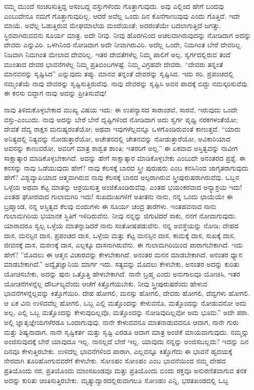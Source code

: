 ನಮ್ಮ ಮುಂದೆ ಸಂಚರಿಸುತ್ತಿದ್ದ ಅಸಂಬದ್ದ ವಸ್ತುಗಳೆಂದು ಗೊತ್ತಾಗುವುದು. ಅವು ಎಲ್ಲಿಂದ ಹೇಗೆ ಬಂದವು ಎಂಬುದೇನೂ ನಮಗೆ ಗೊತ್ತಾಗುವುದಿಲ್ಲ. ಆದರೆ ಅವೆಲ್ಲ ಒಂದು ದಿನ ಕೊನೆಗಾಣುವುವು ಎಂದು ಗೊತ್ತಿದೆ. ಇದೇ ಮಾಯೆ. ಅವೆಲ್ಲ ಓಡುತ್ತಿರುವ ಮೇಘಮಾಲೆಯ ಮಂದೆಯಂತೆ; ಅದರಂತೆಯೇ ಬದಲಾಗುತ್ತಿದೆ ಜಗತ್ತು. ಸ್ಥಿರವಾಗಿರುವವನು ಸೂರ್ಯ ಮಾತ್ರ. ಅದೇ ನೀವು. ನೀವು ಹೊರಗಿನಿಂದ ಅಚಲವಾಗಿರುವುದನ್ನು ನೋಡಿದಾಗ ಅದನ್ನು ದೇವರು ಎನ್ನುವಿರಿ. ಒಳಗಿನಿಂದ ನೋಡಿದಾಗ ಅದೇ ನೀವಾಗಿರುವಿರಿ. ಅದೆಲ್ಲ ಒಂದೇ, ನಿಮಗಿಂತ ಬೇರೆ ದೇವರಿಲ್ಲ. ನಿಜವಾಗಿ ನಿಮಗಿಂತ ಮೇಲಾದ ದೇವರಿಲ್ಲ. ಇತರ ದೇವತೆಗಳೆಲ್ಲ ನಿಮ್ಮ ಪಾಲಿಗೆ ಅಲ್ಪ. ಸ್ವರ್ಗದಲ್ಲಿರುವ ತಂದೆ ಮುಂತಾದ ದೇವರ ಭಾವನೆಗಳೆಲ್ಲ ನಿಮ್ಮ ಪ್ರತಿಬಿಂಬಗಳಷ್ಟೆ. ನಿಮ್ಮ ವಿಗ್ರಹವೇ ದೇವರು. “ದೇವರು ತನ್ನಂತೆ ಮಾನವನನ್ನು ಸೃಷ್ಟಿಸಿದ'' ಎನ್ನುವುದು ತಪ್ಪು. ಮಾನವ ತನ್ನಂತೆ ದೇವರನ್ನು ಸೃಷ್ಟಿಸಿದ. ಇದು ಸರಿ. ಪ್ರಪಂಚದಲ್ಲಿ ನಮ್ಮಂತೆಯೆ ನಾವು ದೇವರನ್ನು ಸೃಷ್ಟಿಸುತ್ತಿರುವೆವು. ನಾವು ದೇವರನ್ನು ಸೃಷ್ಟಿಸಿ ಅವನ ಪಾದಕ್ಕೆ ಬಿದ್ದು ನಮಸ್ಕರಿಸುವೆವು. ಈ ಕನಸು ಬಿದ್ದಾಗ ನಾವು ಅದನ್ನು ಪ್ರೀತಿಸುವೆವು!

ನಾವು ತಿಳಿದುಕೊಳ್ಳಬೇಕಾದ ಮುಖ್ಯ ವಿಷಯ ಇದು: ಈ ಉಪನ್ಯಾಸದ ಸಾರಾಂಶವೆ, ಸಾರವೆ, ಇರುವುದು ಒಂದೇ ವಸ್ತು-ಎಂಬುದು. ನಾವು ಅದನ್ನು ಬೇರೆ ಬೇರೆ ದೃಷ್ಟಿಗಳಿಂದ ನೋಡಿದಾಗ ಅದು ಸ್ವರ್ಗ ಪೃಥ್ವಿ ನರಕಗಳಂತೆಯೋ; ದೇವತೆ ದೆವ್ವ ರಾಕ್ಷಸ ಮನುಷ್ಯರಂತೆಯೋ; ಅಥವಾ ಇವುಗಳೆಲ್ಲವನ್ನೂ ಒಳಗೊಂಡಿರುವಂತೆ ಕಾಣುತ್ತದೆ. “ಯಾರು ಅನಿತ್ಯದಲ್ಲಿ ನಿತ್ಯವನ್ನು ನೋಡುತ್ತಾರೆಯೋ, ಅಚೇತನದಲ್ಲಿ ಚೇತನವನ್ನು ನೋಡುತ್ತಾರೆಯೋ, ಅವಿಕಾರಿಯಾದ ಅವನನ್ನು ಕಾಣುವರೋ, ಅವರಿಗೆ ಮಾತ್ರ ಶಾಶ್ವತ ಶಾಂತಿ; ಇತರರಿಗೆ ಅಲ್ಲ.” ಈ ಏಕವಾದ ಅಸ್ತಿತ್ವವನ್ನು ನಾವೀಗ ಸಾಕ್ಷಾತ್ಕಾರ ಮಾಡಿಕೊಳ್ಳಬೇಕಾಗಿದೆ. ಅದನ್ನು ಹೇಗೆ ಸಾಕ್ಷಾತ್ಕಾರ ಮಾಡಿಕೊಳ್ಳಬೇಕು ಎಂಬುದೇ ಅನಂತರದ ಪ್ರಶ್ನೆ. ಈ ಕನಸನ್ನು ನಾವು ಒಡೆಯುವುದು ಹೇಗೆ? ನಾವು ಕೆಲಸಕ್ಕೆ ಬಾರದ ಸ್ತ್ರೀ ಪುರುಷರು ಎಂಬ ಕನಸಿನಿಂದ ಜಾಗೃತರಾಗುವುದು ಹೇಗೆ? ವಿಶ್ವವ್ಯಾಪಿಯಾದ ಆತ್ಮವಾಗಿರುವ ನಾವು ಕೆಲಸಕ್ಕೆ ಬಾರದ ಅಲ್ಪರಾಗಿರುವ ಸ್ತ್ರೀಪುರುಷರಾಗಿರುವೆವು. ಒಬ್ಬನ ಒಳ್ಳೆಯ ಅಥವಾ ಕೆಟ್ಟ ಮಾತನ್ನು ಆಶ್ರಯಿಸುತ್ತ ಅಂಜಿಕೊಂಡಿರುವೆವು. ಎಂತಹ ಭಯಂಕರವಾದ ಅನ್ಯಾಶ್ರಯ ಇದು! ಎಂತಹ ಘೋರವಾದ ಗುಲಾಮಗಿರಿ ಇದು! ಸುಖದುಃಖಗಳಿಗೆ ಅತೀತನು ನಾನು, ನನ್ನ ಒಂದು ಛಾಯೆಯೇ ಈ ಬ್ರಹ್ಮಾಂಡ, ನನ್ನ ಅಸ್ತಿತ್ವದ ಕೆಲವು ಬಿಂದುಗಳು ಈ ಸೂರ್ಯ ಚಂದ್ರ ತಾರೆಗಳು. ಇಂತಹವನಾದ ನಾನು ಗುಲಾಮಗಿರಿಯ ಭಯಾನಕ ಸ್ಥಿತಿಗೆ ಇಳಿದಿರುವೆನು. ನೀವು ನನ್ನನ್ನು ಜಿಗುಟಿದರೆ ಸಾಕು, ನನಗೆ ನೋವಾಗುವುದು. ಯಾರಾದರೂ ಸ್ವಲ್ಪ ಒಳ್ಳೆಯ ಮಾತನ್ನಾಡಿದರೆ ನಾನು ಸಂತೋಷಪಡುವೆನು. ನನ್ನ ಅವಸ್ಥೆಯನ್ನು ನೋಡಿ; ದೇಹದ ದಾಸ, ಮನಸ್ಸಿನ ದಾಸ, ಪ್ರಪಂಚದ ದಾಸ, ಒಳ್ಳೆಯ ಮತ್ತು ಕೆಟ್ಟ ಮನಸ್ಸಿನ ದಾಸ, ಕಾಮಕ್ಕೆ ದಾಸ, ಸುಖಕ್ಕೆ ದಾಸ, ಜೀವನಕ್ಕೆ ದಾಸ, ಮರಣಕ್ಕೆ ದಾಸ, ಎಲ್ಲಕ್ಕೂ ದಾಸನಾಗಿರುವೆನು. ಈ ಗುಲಾಮಗಿರಿಯಿಂದ ಪಾರಾಗಬೇಕಾಗಿದೆ. ಇದು ಹೇಗೆ? ''ಮೊದಲು ಈ ಆತ್ಮನ ವಿಚಾರವನ್ನು ಕೇಳಬೇಕಾಗಿದೆ. ಅನಂತರ ಮನನ ಮಾಡಬೇಕಾಗಿದೆ. ಅನಂತರ ಧ್ಯಾನ ಮಾಡಬೇಕಾಗಿದೆ.'' ಅದ್ವೈತಜ್ಞಾನಿಯ ಮಾರ್ಗ ಇದು. ಸತ್ಯವನ್ನು ಮೊದಲು ಕೇಳಬೇಕು, ಅನಂತರ ಅದನ್ನು ಕುರಿತು ಯೋಚಿಸಬೇಕು, ಅದನ್ನು ಪುನಃ ಒತ್ತೊತ್ತಿ ಹೇಳಬೇಕಾಗಿದೆ. ನಾನೇ ಬ್ರಹ್ಮ ಎಂದು ಅನುಗಾಲವೂ ಯೋಚಿಸಿ, ಇತರ ಯೋಚನೆಗಳನ್ನೆಲ್ಲ ದೌರ್ಬಲ್ಯವೆಂದು ಆಚೆಗೆ ಕಿತ್ತೊಗೆಯಬೇಕು. ನೀವು ಸ್ತ್ರೀಪುರುಷರೆಂದು ಹೇಳುವ ಭಾವನೆಗಳನ್ನೆಲ್ಲವನ್ನು ಕಿತ್ತೊಗೆಯಿರಿ. ದೇಹ ಹೋಗಲಿ, ಮನಸ್ಸು ಹೋಗಲಿ, ದೇವರು ಹೋಗಲಿ, ದೆವ್ವಗಳು ಹೋಗಲಿ. ಆ ಏಕ ವಿನಃ ಉಳಿದವೆಲ್ಲ ಹೋಗಲಿ, ಒಬ್ಬ ಎಲ್ಲಿ ಮತ್ತೊಂದನ್ನು ಕೇಳುವನೊ, ಮತ್ತೊಂದನ್ನು ನೋಡುವನೋ ಅದು ಅಲ್ಪ. ಎಲ್ಲಿ ಒಬ್ಬ ಮತ್ತೊಂದನ್ನು ಕೇಳುವುದಿಲ್ಲವೊ, ಮತ್ತೊಂದನ್ನು ನೋಡಿವುದಿಲ್ಲವೋ ಅದು ಭೂಮ.” ಅದೇ ಪರಾ. ಅಲ್ಲಿ ಜ್ಞಾತೃಜ್ಞೇಯಗಳೆರಡೂ ಒಂದಾಗುವುವು. ನಾನೇ ಕೇಳುವವನೂ ಮಾತನಾಡುವವನೂ ಆದಾಗ, ನಾನೇ ಗುರು ಮತ್ತು ಶಿಷ್ಯನಾದಾಗ, ನಾನೇ ಸೃಷ್ಟಿಕರ್ತ ಮತ್ತು ಸೃಷ್ಟಿ ಎರಡೂ ಆದಾಗ ಮಾತ್ರ ಅಂಜಿಕೆ ಮಾಯವಾಗುವುದು. ನಮ್ಮನ್ನು ಅಂಜಿಸುವುದಕ್ಕೆ ಬೇರೆ ಯಾವುದೂ ಇಲ್ಲ. ನಾನಲ್ಲದೆ ಬೇರೆ ಇಲ್ಲ. ಯಾವುದು ನನ್ನನ್ನು ಅಂಜಿಸಬಲ್ಲದು? ಇದನ್ನು ದಿನ ದಿನವೂ ಕೇಳುತ್ತಿರಬೇಕು. ಉಳಿದೆಲ್ಲ ಭಾವನೆಗಳಿಂದ ಪಾರಾಗಿ, ಎಲ್ಲವನ್ನೂ ಕಿತ್ತೊಗೆದು ಈ ಭಾವನೆ ಹೃದಯಕ್ಕೆ ನೇರವಾಗಿ ತೂರಿಹೋಗುವವರೆಗೆ ಕೇಳಬೇಕು. ಸೋಽಹಂ ಸೋಽಹಂ ಎಂಬ ಭಾವನೆಯಿಂದ ನಮ್ಮ ದೇಹದ ಪ್ರತಿಯೊಂದು ನರ, ಪ್ರತಿಯೊಂದು ಮಾಂಸಖಂಡವೂ ಮತ್ತು ಪ್ರತಿಯೊಂದು ಬಿಂದು ರಕ್ತವೂ ಅನುರಣಿತವಾಗುವ ತನಕ ಅದನ್ನು ಕುರಿತು ಚಿಂತಿಸುತ್ತಿರಬೇಕು. ಮೃತ್ಯುದ್ವಾರದಲ್ಲಿರುವಾಗಲೂ ಸೋಽಹಂ ಎನ್ನಿ, ಭರತಖಂಡದಲ್ಲಿ ಒಬ್ಬ 